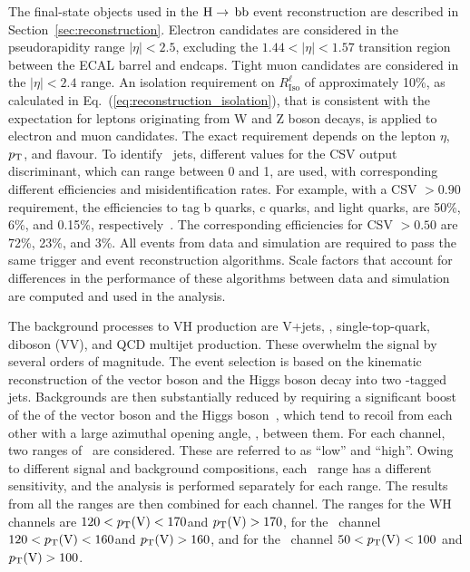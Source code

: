 \documentclass[12pt,twoside,a4paper,cmspaper,final,collab]{cms-tdr}
\begin{document}
The final-state objects used in the $\mathrm{H} \to \,\mathrm{b} \mathrm{b}$  event reconstruction
are described in Section~\ref{sec:reconstruction}. Electron candidates are
considered in the pseudorapidity range $\left | \eta \right | < 2.5$,
excluding the  $1.44 <\left | \eta \right | < 1.57$ transition
region between the ECAL barrel and endcaps. Tight muon candidates are
considered in the  $\left | \eta \right | < 2.4$ range.
An isolation requirement on $R_\text{Iso}^{\ell}$ of approximately 10\%, as calculated in
Eq.~(\ref{eq:reconstruction_isolation}), that is consistent
with the expectation for leptons originating from W and Z boson decays,
is applied to electron and muon candidates. The exact requirement depends on the lepton $\eta$, $p_{\mathrm{T}}$,
and flavour. To identify \cPqb\ jets, different values for the CSV output discriminant, which can
range between 0 and 1, are used, with
corresponding different efficiencies and misidentification rates.  For example, with
a CSV $>0.90$ requirement, the efficiencies to tag
b quarks, c quarks, and light quarks, are 50\%,
6\%, and 0.15\%, respectively~\cite{CMS-PAS-BTV-12-001}. The corresponding efficiencies for
CSV $>0.50$ are 72\%, 23\%, and 3\%. All events from data and simulation are required to
pass the same trigger and event reconstruction algorithms. Scale
factors that account for differences in the performance of these
algorithms between data and simulation are computed and used in
the analysis.




The background processes to VH production are V+jets, \ttbar,
single-top-quark, diboson (VV),
and QCD multijet production. These overwhelm the signal by several orders of
magnitude. The event selection is based on the kinematic
reconstruction of the vector boson and the Higgs boson decay
into two \cPqb-tagged jets. Backgrounds are then substantially reduced by
requiring a significant boost of the \pt of the vector boson and the
Higgs boson~\cite{PhysRevLett.100.242001}, which tend
to recoil from each other with a large azimuthal opening angle,  \dphiVH,
between them.  For each channel, two ranges
  of \ptV\ are considered. These are
        referred to as ``low'' and ``high''.
        Owing to different signal and background
        compositions, each \ptV\ range  has a different sensitivity, and
        the analysis is performed separately for each range. The
        results from all the ranges are then combined for each channel. The ranges
        for the WH channels are $120<p_{\mathrm{T}}(\mathrm{V})<170$\GeV and $p_{\mathrm{T}}(\mathrm{V})>170$\GeV,
        for the \ZnnH\ channel $120<p_{\mathrm{T}}(\mathrm{V})<160$\GeV and
        $p_{\mathrm{T}}(\mathrm{V})>160$\GeV, and for the \ZllH\ channel $50<p_{\mathrm{T}}(\mathrm{V})<100$\GeV
        and $p_{\mathrm{T}}(\mathrm{V})>100$\GeV.
\end{document}
